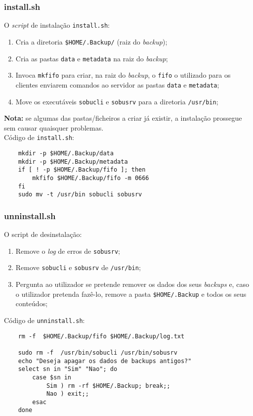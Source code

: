 \documentclass[a4paper,12pt,titlepage,portuguese]{article}
\begin{document}
\newpage
\subsubsection{install.sh}
O \emph{script} de instalação \texttt{install.sh}:
	\begin{enumerate}
		\item Cria a diretoria \texttt{\$HOME/.Backup/} (raiz do \emph{backup});
		\item Cria as pastas \texttt{data} e \texttt{metadata} na raiz do \emph{backup};
		\item Invoca \texttt{mkfifo} para criar, na raiz do \emph{backup}, o \texttt{fifo} o utilizado para os clientes enviarem comandos ao servidor as pastas \texttt{data} e \texttt{metadata};
		\item Move os executáveis \texttt{sobucli} e \texttt{sobusrv} para a diretoria \texttt{/usr/bin};
	\end{enumerate}
\textbf{Nota:} se algumas das pastas/ficheiros a criar já existir, a instalação prossegue sem causar quaisquer problemas. 
\\Código de \texttt{install.sh}:
	\begin{verbatim}
	mkdir -p $HOME/.Backup/data
	mkdir -p $HOME/.Backup/metadata
	if [ ! -p $HOME/.Backup/fifo ]; then
		mkfifo $HOME/.Backup/fifo -m 0666
	fi
	sudo mv -t /usr/bin sobucli sobusrv
	\end{verbatim}

\subsubsection{unninstall.sh}
O script de desinstalação:
	\begin{enumerate}
		\item Remove o \emph{log} de erros de \texttt{sobusrv};
		\item Remove \texttt{sobucli} e \texttt{sobusrv} de \texttt{/usr/bin};
		\item Pergunta ao utilizador se pretende remover os dados dos seus \emph{backups} e, caso o utilizador pretenda fazê-lo, remove a pasta \texttt{\$HOME/.Backup} e todos os seus conteúdos;
	\end{enumerate}
Código de \texttt{unninstall.sh}:
	\begin{verbatim}
	rm -f  $HOME/.Backup/fifo $HOME/.Backup/log.txt

	sudo rm -f  /usr/bin/sobucli /usr/bin/sobusrv 
	echo "Deseja apagar os dados de backups antigos?"
	select sn in "Sim" "Nao"; do
	    case $sn in
	        Sim ) rm -rf $HOME/.Backup; break;;
	        Nao ) exit;;
	    esac
	done
	\end{verbatim}
\end{document}
